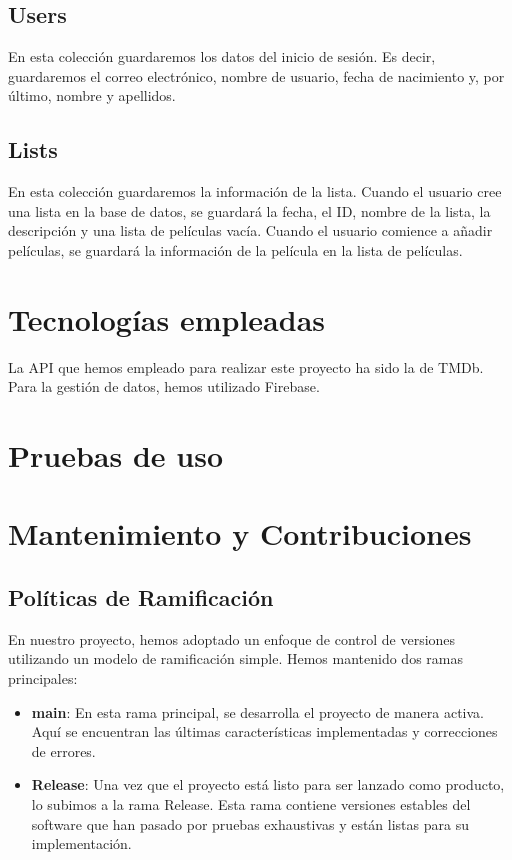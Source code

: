 \documentclass{article}
\begin{document}
\subsection{Users}
En esta colección guardaremos los datos del inicio de sesión. Es decir, guardaremos el correo electrónico, nombre de usuario, fecha de nacimiento y, por último, nombre y apellidos.

\subsection{Lists}
En esta colección guardaremos la información de la lista. Cuando el usuario cree una lista en la base de datos, se guardará la fecha, el ID, nombre de la lista, la descripción y una lista de películas vacía. Cuando el usuario comience a añadir películas, se guardará la información de la película en la lista de películas.

\section{Tecnologías empleadas}
La API que hemos empleado para realizar este proyecto ha sido la de TMDb. Para la gestión de datos, hemos utilizado Firebase.

\section{Pruebas de uso}


\section{Mantenimiento y Contribuciones}

\subsection{Políticas de Ramificación}

En nuestro proyecto, hemos adoptado un enfoque de control de versiones utilizando un modelo de ramificación simple. Hemos mantenido dos ramas principales:

\begin{itemize}
    \item \textbf{main}: En esta rama principal, se desarrolla el proyecto de manera activa. Aquí se encuentran las últimas características implementadas y correcciones de errores.
    
    \item \textbf{Release}: Una vez que el proyecto está listo para ser lanzado como producto, lo subimos a la rama Release. Esta rama contiene versiones estables del software que han pasado por pruebas exhaustivas y están listas para su implementación.
\end{itemize}
\end{document}

